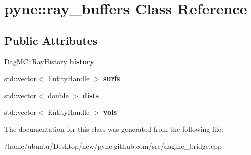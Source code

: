 \hypertarget{classpyne_1_1ray__buffers}{}\section{pyne\+:\+:ray\+\_\+buffers Class Reference}
\label{classpyne_1_1ray__buffers}
\subsection*{Public Attributes}
\begin{DoxyCompactItemize}
\item 
Dag\+M\+C\+::\+Ray\+History {\bfseries history}\hypertarget{classpyne_1_1ray__buffers_adb3331dbf290b1c6d44c37931a917a7e}{}\label{classpyne_1_1ray__buffers_adb3331dbf290b1c6d44c37931a917a7e}

\item 
std\+::vector$<$ Entity\+Handle $>$ {\bfseries surfs}\hypertarget{classpyne_1_1ray__buffers_ac2a784c86703f7253861ceaa73ba5e6b}{}\label{classpyne_1_1ray__buffers_ac2a784c86703f7253861ceaa73ba5e6b}

\item 
std\+::vector$<$ double $>$ {\bfseries dists}\hypertarget{classpyne_1_1ray__buffers_a2904cd95dd5c1cb04ca796cf025bced1}{}\label{classpyne_1_1ray__buffers_a2904cd95dd5c1cb04ca796cf025bced1}

\item 
std\+::vector$<$ Entity\+Handle $>$ {\bfseries vols}\hypertarget{classpyne_1_1ray__buffers_a2d059fcf9432e03b28eade60308b2498}{}\label{classpyne_1_1ray__buffers_a2d059fcf9432e03b28eade60308b2498}

\end{DoxyCompactItemize}


The documentation for this class was generated from the following file\+:\begin{DoxyCompactItemize}
\item 
/home/ubuntu/\+Desktop/new/pyne.\+github.\+com/src/dagmc\+\_\+bridge.\+cpp\end{DoxyCompactItemize}
